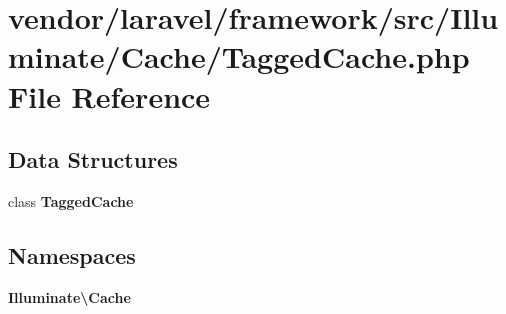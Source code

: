\section{vendor/laravel/framework/src/\+Illuminate/\+Cache/\+Tagged\+Cache.php File Reference}
\label{_tagged_cache_8php}
\subsection*{Data Structures}
\begin{DoxyCompactItemize}
\item 
class {\bf Tagged\+Cache}
\end{DoxyCompactItemize}
\subsection*{Namespaces}
\begin{DoxyCompactItemize}
\item 
 {\bf Illuminate\textbackslash{}\+Cache}
\end{DoxyCompactItemize}

